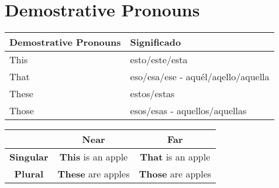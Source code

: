 \documentclass{elegantbook}
\begin{document}
    \section{Demostrative Pronouns}
    \begin{center}
        \begin{tabular}{l|l}
            \textbf{Demostrative Pronouns}&\textbf{Significado}\\
            \hline
            This&esto/este/esta\\
            That&eso/esa/ese - aquél/aqello/aquella\\
            These&estos/estas\\
            Those&esos/esas - aquellos/aquellas
        \end{tabular}
        \begin{tabular}{c|c|c}
            &\textbf{Near}&\textbf{Far}\\
            \hline
            \textbf{Singular}&\textbf{This} is an apple&\textbf{That} is an apple\\
            \textbf{Plural}&\textbf{These} are apples&\textbf{Those} are apples\\
        \end{tabular}
    \end{center}
\end{document}
